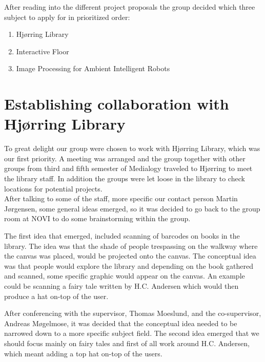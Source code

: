 After reading into the different project proposals the group decided which three subject to apply for in prioritized order:

\begin{enumerate} 
\item Hj{\o}rring Library 
\item Interactive Floor 
\item Image Processing for Ambient Intelligent Robots 
\end{enumerate}

\section{Establishing collaboration with Hj{\o}rring Library}

To great delight our group were chosen to work with Hj{\o}rring Library, which was our first priority. A meeting was arranged and the group together with other groups from third and fifth semester of Medialogy traveled to Hj{\o}rring to meet the library staff. In addition the groups were let loose in the library to check locations for potential projects.\\
After talking to some of the staff, more specific our contact person Martin J{\o}rgensen, some general ideas emerged, so it was decided to go back to the group room at NOVI to do some brainstorming within the group.

The first idea that emerged, included scanning of barcodes on books in the library. The idea was that the shade of people trespassing on the walkway where the canvas was placed, would be projected onto the canvas. The conceptual idea was that people would explore the library and depending on the book gathered and scanned, some specific graphic would appear on the canvas. An example could be scanning a fairy tale written by H.C. Andersen which would then produce a hat on-top of the user.

After conferencing with the supervisor, Thomas Moeslund, and the co-supervisor, Andreas M{\o}gelmose, it was decided that the conceptual idea needed to be narrowed down to a more specific subject field. The second idea emerged that we should focus mainly on fairy tales and first of all work around H.C. Andersen, which meant adding a top hat on-top of the users.

